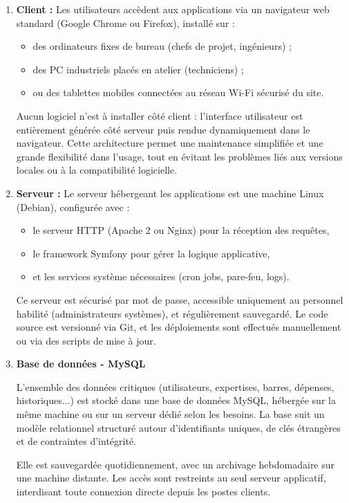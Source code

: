 \documentclass[11pt,a4paper]{article}
\begin{document}
\begin{enumerate}
\item \textbf{Client : }
Les utilisateurs accèdent aux applications via un navigateur web standard (Google Chrome ou Firefox), installé sur :
	\begin{itemize}
    \item des ordinateurs fixes de bureau (chefs de projet, ingénieurs) ;
    \item des PC industriels placés en atelier (techniciens) ;
    \item ou des tablettes mobiles connectées au réseau Wi-Fi sécurisé du site.
	\end{itemize}

Aucun logiciel n’est à installer côté client : l’interface utilisateur est entièrement générée côté serveur puis rendue dynamiquement dans le navigateur. Cette architecture permet une maintenance simplifiée et une grande flexibilité dans l’usage, tout en évitant les problèmes liés aux versions locales ou à la compatibilité logicielle.

\item \textbf{Serveur :}
Le serveur hébergeant les applications est une machine Linux (Debian), configurée avec :
\begin{itemize}
    \item le serveur HTTP (Apache 2 ou Nginx) pour la réception des requêtes,
    \item le framework Symfony pour gérer la logique applicative,
    \item et les services système nécessaires (cron jobs, pare-feu, logs).
\end{itemize}

Ce serveur est sécurisé par mot de passe, accessible uniquement au personnel habilité (administrateurs systèmes), et régulièrement sauvegardé. Le code source est versionné via Git, et les déploiements sont effectués manuellement ou via des scripts de mise à jour.


\item \textbf{ Base de données - MySQL}

L’ensemble des données critiques (utilisateurs, expertises, barres, dépenses, historiques...) est stocké dans une base de données MySQL, hébergée sur la même machine ou sur un serveur dédié selon les besoins. La base suit un modèle relationnel structuré autour d’identifiants uniques, de clés étrangères et de contraintes d’intégrité.

Elle est sauvegardée quotidiennement, avec un archivage hebdomadaire sur une machine distante. Les accès sont restreints au seul serveur applicatif, interdisant toute connexion directe depuis les postes clients.


\end{enumerate}
\end{document}
